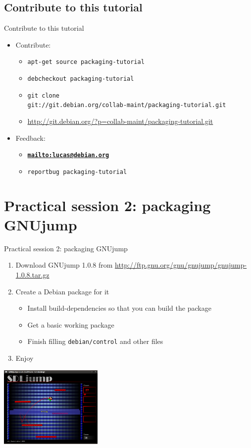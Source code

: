 \documentclass[10pt,final]{beamer}
\begin{document}
\subsection{Contribute to this tutorial}
\begin{frame}{Contribute to this tutorial}
	\begin{itemize}
		\item Contribute:
			\begin{itemize}
				\item {\small \texttt{apt-get source packaging-tutorial}}
					\hbr
				\item  {\small \texttt{debcheckout packaging-tutorial}}
					\hbr
				\item  {\small \texttt{git clone\\ git://git.debian.org/collab-maint/packaging-tutorial.git}}
					\hbr
				\item {\small \url{http://git.debian.org/?p=collab-maint/packaging-tutorial.git}}
			\end{itemize}
			\br
		\item Feedback:
			\begin{itemize}
				\item \href{mailto:lucas@debian.org}{\textbf{\texttt{mailto:lucas@debian.org}}}
					\hbr
				\item {\small \texttt{reportbug packaging-tutorial}}
			\end{itemize}
	\end{itemize}
\end{frame}

\section{Practical session 2: packaging GNUjump}
\begin{frame}{Practical session 2: packaging GNUjump}
\begin{enumerate}
	\item Download GNUjump 1.0.8 from
		\url{http://ftp.gnu.org/gnu/gnujump/gnujump-1.0.8.tar.gz}
		\br
	\item Create a Debian package for it
		\begin{itemize}
			\item Install build-dependencies so that you can build the package
			\item Get a basic working package
			\item Finish filling \texttt{debian/control} and other files
		\end{itemize}
		\br
	\item Enjoy
\end{enumerate}
\centerline{\includegraphics[width=5cm]{figs/gnujump.png}}
\end{frame}
\end{document}
